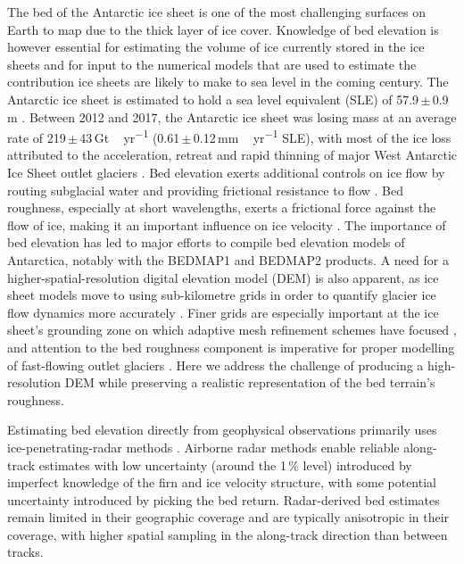 \documentclass[tc, noline]{copernicus}
\begin{document}
\hack{\newpage}

\introduction

The bed of the Antarctic ice sheet is one of the most challenging surfaces on Earth to map due to the thick layer of ice cover. Knowledge of bed
elevation is however essential for estimating the volume of ice currently stored in the ice sheets and for input to the numerical models that are
used to estimate the contribution ice sheets are likely to make to sea level in the coming century. The Antarctic ice sheet is estimated to hold a
sea level equivalent (SLE) of 57.9\,$\pm$\,0.9\,\unit{m} \citep{MorlighemDeepglacialtroughs2019}. Between 2012 and 2017, the Antarctic ice sheet was
losing mass at an average rate of 219\,$\pm$\,43\,\unit{Gt\,yr^{-1}} (0.61\,$\pm$\,0.12\,\unit{mm\,yr^{-1}} SLE), with most of the ice loss attributed
to the acceleration, retreat and rapid thinning of major West Antarctic Ice Sheet outlet glaciers \citep{IMBIEMassbalanceAntarctic2018}. Bed elevation
exerts additional controls on ice flow by routing subglacial water and providing frictional resistance to flow
\citep{SiegertMacroscalebedroughness2004}. Bed roughness, especially at short wavelengths, exerts a frictional force against the flow of ice, making
it an important influence on ice velocity \citep{BinghamDiverselandscapesPine2017,FalciniQuantifyingbedroughness2018}. The importance of bed elevation
has led to major efforts to compile bed elevation models of Antarctica, notably with the BEDMAP1 \citep{LytheBEDMAPnewice2001} and BEDMAP2
\citep{FretwellBedmap2improvedice2013} products. A need for a higher-spatial-resolution digital elevation model (DEM) is also apparent, as ice sheet
models move to using sub-kilometre grids in order to quantify glacier ice flow dynamics more accurately
\citep{LeBrocqimprovedAntarcticdataset2010,Grahamhighresolutionsyntheticbed2017}. Finer grids are especially important at the ice sheet's grounding
zone on which adaptive mesh refinement schemes have focused \citep[e.g.][]{CornfordAdaptivemeshrefinement2016}, and attention to the bed roughness
component is imperative for proper modelling of fast-flowing outlet glaciers
\citep{DurandImpactbedrockdescription2011,NiasContrastingmodelledsensitivity2016}. Here we address the challenge of producing a high-resolution DEM
while preserving a realistic representation of the bed terrain's roughness.

Estimating bed elevation directly from geophysical observations primarily uses ice-penetrating-radar methods
\citep[e.g.][]{RobinRadioechoexploration1970}. Airborne radar methods enable reliable along-track estimates with low uncertainty (around the 1\,{\%}
level) introduced by imperfect knowledge of the firn and ice velocity structure, with some potential uncertainty introduced by picking the bed
return. Radar-derived bed estimates remain limited in their geographic coverage \citep{FretwellBedmap2improvedice2013} and are typically anisotropic
in their coverage, with higher spatial sampling in the along-track direction than between tracks.
\end{document}
